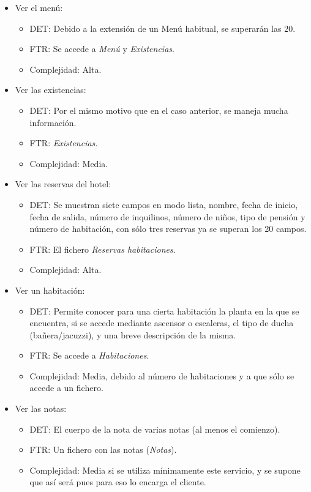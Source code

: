 \documentclass[spanish,a4paper,12pt]{report}	%
\begin{document}
\begin{itemize}
		\item{Ver el menú:} 
		\begin{itemize}
 			\item{DET:} Debido a la extensión de un Menú habitual, se superarán las 20.
			\item{FTR:} Se accede a \textit{Menú} y \textit{Existencias}.
			\item{Complejidad:} Alta.
		\end{itemize}
		\item{Ver las existencias:} 
		\begin{itemize}
 			\item{DET:} Por el mismo motivo que en el caso anterior, se maneja mucha información.
			\item{FTR:} \textit{Existencias.}
			\item{Complejidad:} Media.
		\end{itemize}
		\item{Ver las reservas del hotel:} 
		\begin{itemize}
 			\item{DET:} Se muestran siete campos en modo lista, nombre, fecha de inicio, fecha de salida, número de inquilinos, número de niños, tipo de pensión y número de habitación, con sólo tres reservas ya se superan los 20 campos.
			\item{FTR:} El fichero \textit{Reservas habitaciones.}
			\item{Complejidad:} Alta.	
		\end{itemize}		
		\item{Ver un habitación:} 
		\begin{itemize}
 			\item{DET:} Permite conocer para una cierta habitación la planta en la que se encuentra, si se accede mediante ascensor o escaleras, el tipo de ducha (bañera/jacuzzi), y una breve descripción de la misma.
			\item{FTR:} Se accede a \textit{Habitaciones}.
			\item{Complejidad:} Media, debido al número de habitaciones y a que sólo se accede a un fichero.
		\end{itemize}
		\item{Ver las notas:} 
		\begin{itemize}
 			\item{DET:} El cuerpo de la nota  de varias notas (al menos el comienzo).
			\item{FTR:} Un fichero con las notas (\textit{Notas}).
			\item{Complejidad:} Media si se utiliza mínimamente este servicio, y se supone que así será pues para eso lo encarga el cliente.

\end{itemize}
\end{itemize}
\end{document}
